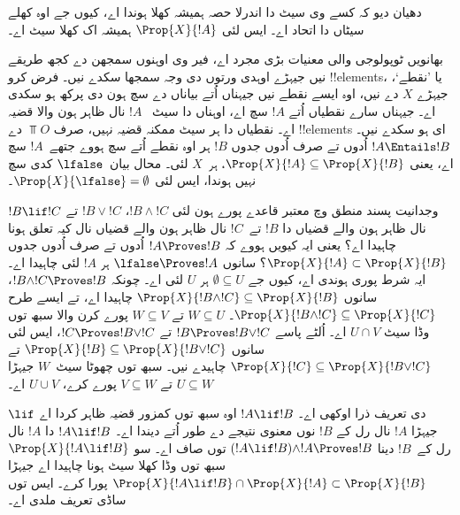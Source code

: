 \documentclass[../../../include/open-logic-section]{subfiles}
\begin{document}
دھیان دیو کہ کسے وی سیٹ دا اندرلا حصہ ہمیشہ کھلا ہوندا اے، کیوں جے اوہ
کھلے سیٹاں دا اتحاد اے۔ ایس لئی $\Prop{X}{!A}$ ہمیشہ اک کھلا سیٹ اے۔

بھانویں ٹوپولوجی والی معنیات بڑی مجرد اے، فیر وی اوہنوں سمجھن دے کجھ
طریقے نیں جیہڑے اوہدی ورتوں دی وجہ سمجھا سکدے نیں۔ فرض کرو !!{element}s، یا ’نقطے‘، جیہڑے $X$ دے نیں، اوہ ایسے نقطے نیں
جیہناں اُتے بیاناں دے سچ ہون دی
پرکھ ہو سکدی اے۔ جیہناں سارے نقطیاں اُتے $!A$ سچ اے، اوہناں دا سیٹ
~$!A$ نال ظاہر ہون والا قضیہ اے۔ نقطیاں دا ہر سیٹ ممکنہ قضیہ نہیں، صرف
$\Top{O}$ دے !!{element}s ای ہو سکدے نیں۔ $!A \Entails !B$ اُدوں تے صرف
اُدوں جدوں $!B$ ہر اوہ نقطے اُتے سچ ہووے جتھے~$!A$ سچ اے، یعنی
$\Prop{X}{!A} \subseteq \Prop{X}{!B}$، ہر~$X$ لئی۔ محال بیان~$\lfalse$
کدی سچ نہیں ہوندا، ایس لئی $\Prop{X}{\lfalse} = \emptyset$۔

وجدانیت پسند منطق وچ معتبر قاعدے پورے ہون لئی $!B \land !C$، $!B \lor !C$
تے $!B \lif !C$ نال ظاہر ہون والے قضیاں دا $!B$ تے~$!C$ نال ظاہر ہون والے
قضیاں نال کیہ تعلق ہونا چاہیدا اے؟ یعنی ایہ کیویں ہووے کہ $!A \Proves
!B$ اُدوں تے صرف اُدوں جدوں $\Prop{X}{!A} \subset \Prop{X}{!B}$؟
سانوں $\lfalse \Proves !A$ ہر $!A$ لئی چاہیدا اے۔ ایہ شرط پوری ہوندی اے،
کیوں جے $\emptyset \subseteq U$ ہر $U$ لئی اے۔ چونکہ $!B \land !C \Proves !B$،
سانوں $\Prop{X}{!B \land !C} \subseteq \Prop{X}{!B}$ چاہیدا اے، تے
ایسے طرح $\Prop{X}{!B \land !C} \subseteq \Prop{X}{!C}$۔ $W \subseteq U$
تے $W \subseteq V$ پورے کرن والا سبھ توں وڈا سیٹ $U \cap V$ اے۔
اُلٹے پاسے $!B \Proves !B \lor !C$ تے $!C \Proves !B \lor !C$، ایس لئی
سانوں $\Prop{X}{!B} \subseteq \Prop{X}{!B \lor !C}$ تے
$\Prop{X}{!C} \subseteq \Prop{X}{!B \lor !C}$ چاہیدے نیں۔ سبھ توں چھوٹا
سیٹ~$W$ جیہڑا $U \subseteq W$ تے $V \subseteq W$ پورے کرے، $U \cup V$ اے۔

$\lif$ دی تعریف ذرا اوکھی اے۔ $!A \lif !B$ اوہ سبھ توں کمزور قضیہ ظاہر
کردا اے جیہڑا $!A$ نال رل کے $!B$ نوں معنوی نتیجے دے طور اُتے دیندا اے۔
$!A \lif !B$ دا $!A$ نال رل کے~$!B$ دینا $(!A \lif !B)
\land !A \Proves !B $ توں صاف اے۔ سو $\Prop{X}{!A \lif !B}$ سبھ توں وڈا کھلا
سیٹ ہونا چاہیدا اے جیہڑا $\Prop{X}{!A \lif !B} \cap \Prop{X}{!A}
\subset \Prop{X}{!B}$ پورا کرے۔ ایس توں ساڈی تعریف ملدی اے۔
\end{document}
